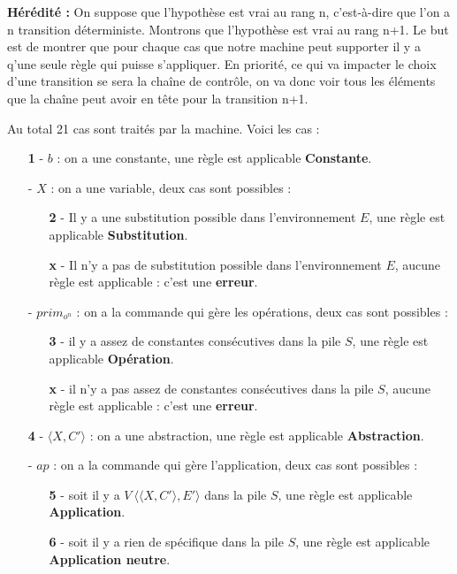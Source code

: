 \documentclass[10pt,a4paper]{report}
\begin{document}
	 
	\textbf{Hérédité :} On suppose que l'hypothèse est vrai au rang n, c'est-à-dire que l'on a n transition déterministe. Montrons que l'hypothèse est vrai au rang n+1. Le but est de montrer que pour chaque cas que notre machine peut supporter il y a q'une seule règle qui puisse s'appliquer. En priorité, ce qui va impacter le choix d'une transition se sera la chaîne de contrôle, on va donc voir tous les éléments que la chaîne peut avoir en tête pour la transition n+1. 
	\bigbreak
	
	
	Au total 21 cas sont traités par la machine. Voici les cas :
	\medbreak
	
	\begin{enumerate}
		\item[\textbf{1} -] $b$ : on a une constante, une règle est applicable \textbf{Constante}.
		\medbreak
		
		\item[-] $X$ : on a une variable, deux cas sont possibles :
		\begin{enumerate}
			\item[\textbf{2} -] Il y a une substitution possible dans l'environnement $E$, une règle est applicable \textbf{Substitution}.
			\item[\textbf{x} -] Il n'y a pas de substitution possible dans l'environnement $E$, aucune règle est applicable : c'est une \textbf{erreur}.
		\end{enumerate}
		\medbreak
		
		\item[-] $prim_{o^{n}}$ : on a la commande qui gère les opérations, deux cas sont possibles :
		\begin{enumerate}
			\item[\textbf{3} -] il y a assez de constantes consécutives dans la pile $S$, une règle est applicable \textbf{Opération}.
			\item[\textbf{x} -] il n'y a pas assez de constantes consécutives dans la pile $S$, aucune règle est applicable : c'est une \textbf{erreur}.	
		\end{enumerate}
		\medbreak
		
		\item[\textbf{4} -] $\langle X,C'\rangle$ : on a une abstraction, une règle est applicable \textbf{Abstraction}.
		\medbreak
		
		\item[-] $ap$ : on a la commande qui gère l'application, deux cas sont possibles :
		\begin{enumerate}
			\item[\textbf{5} -] soit il y a $V~\langle\langle X,C'\rangle,E'\rangle$ dans la pile $S$, une règle est applicable \textbf{Application}.
			\item[\textbf{6} -] soit il y a rien de spécifique dans la pile $S$, une règle est applicable \textbf{Application neutre}.
		\end{enumerate}
		\medbreak
		

\end{enumerate}
\end{document}
